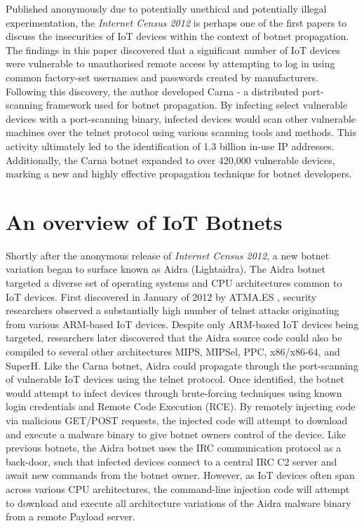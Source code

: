 Published anonymously due to potentially unethical and potentially illegal experimentation, the \textit{Internet Census 2012} \citep{Cencus2012} is perhaps one of the first papers to discuss the insecurities of IoT devices within the context of botnet propagation. The findings in this paper discovered that a significant number of IoT devices were vulnerable to unauthorised remote access by attempting to log in using common factory-set usernames and passwords created by manufacturers. Following this discovery, the author developed Carna - a distributed port-scanning framework used for botnet propagation. By infecting select vulnerable devices with a port-scanning binary, infected devices would scan other vulnerable machines over the telnet protocol using various scanning tools and methods. This activity ultimately led to the identification of 1.3 billion in-use IP addresses. Additionally, the Carna botnet expanded to over 420,000 vulnerable devices, marking a new and highly effective propagation technique for botnet developers.




\section{An overview of IoT Botnets}

Shortly after the anonymous release of \textit{Internet Census 2012}, a new botnet variation began to surface known as Aidra (Lightaidra). \citep{AidraSource} The Aidra botnet targeted a diverse set of operating systems and CPU architectures common to IoT devices. First discovered in January of 2012 by ATMA.ES \citep{ATMA2012}, security researchers observed a substantially high number of telnet attacks originating from various ARM-based IoT devices. \citep{NJCCIC2016} Despite only ARM-based IoT devices being targeted, researchers later discovered that the Aidra source code could also be compiled to several other architectures MIPS, MIPSel, PPC, x86/x86-64, and SuperH. Like the Carna botnet, Aidra could propagate through the port-scanning of vulnerable IoT devices using the telnet protocol. Once identified, the botnet would attempt to infect devices through brute-forcing techniques using known login credentials and Remote Code Execution (RCE). By remotely injecting code via malicious GET/POST requests, the injected code will attempt to download and execute a malware binary to give botnet owners control of the device. Like previous botnets, the Aidra botnet uses the IRC communication protocol as a back-door, such that infected devices connect to a central IRC C2 server and await new commands from the botnet owner. However, as IoT devices often span across various CPU architectures, the command-line injection code will attempt to download and execute all architecture variations of the Aidra malware binary from a remote Payload server.

